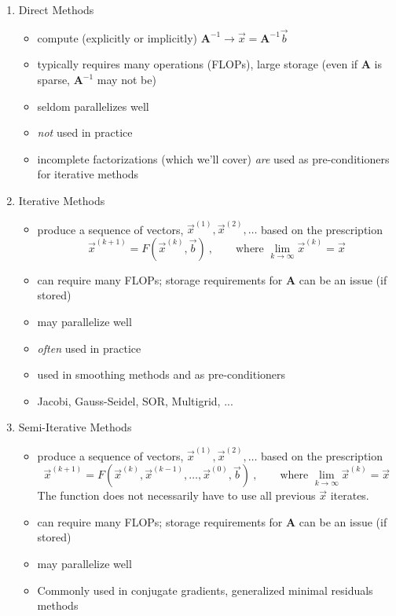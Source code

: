 \documentclass[12pt]{article}
\newcommand{\ve}[1]{\ensuremath{\mathbf{#1}}}
\begin{document}
\begin{enumerate}
\item Direct Methods
  \begin{itemize}
  \item compute (explicitly or implicitly) $\ve{A}^{-1} \rightarrow \vec{x} = \ve{A}^{-1}\vec{b}$
  \item typically requires many operations (FLOPs), large storage (even if $\ve{A}$ is sparse, $\ve{A}^{-1}$ may not be)
  \item seldom parallelizes well
  \item \emph{not} used in practice
  \item incomplete factorizations (which we'll cover) \emph{are} used as pre-conditioners for iterative methods
  \end{itemize}
  
\item Iterative Methods
  \begin{itemize}
  \item produce a sequence of vectors, $\vec{x}^{(1)}, \vec{x}^{(2)}, \dots$ based on the prescription
  \[\vec{x}^{(k+1)} = F(\vec{x}^{(k)}, \vec{b})\:, \qquad \text{where } \displaystyle \lim_{k \rightarrow \infty} \vec{x}^{(k)} = \vec{x}\]
  \item can require many FLOPs; storage requirements for $\ve	{A}$ can be an issue (if stored)
  \item may parallelize well
  \item \emph{often} used in practice
  \item used in smoothing methods and as pre-conditioners
  \item Jacobi, Gauss-Seidel, SOR, Multigrid, ...
  \end{itemize}
  
\item Semi-Iterative Methods
  \begin{itemize}
    \item produce a sequence of vectors, $\vec{x}^{(1)}, \vec{x}^{(2)}, \dots$ based on the prescription
  \[\vec{x}^{(k+1)} = F(\vec{x}^{(k)}, \vec{x}^{(k-1)}, \dots, \vec{x}^{(0)}, \vec{b})\:, \qquad \text{where } \displaystyle \lim_{k \rightarrow \infty} \vec{x}^{(k)} = \vec{x}\]  
  The function does not necessarily have to use all previous $\vec{x}$ iterates.
  \item can require many FLOPs; storage requirements for $\ve	{A}$ can be an issue (if stored)
  \item may parallelize well
  \item Commonly used in conjugate gradients, generalized minimal residuals methods
  \end{itemize}
\end{enumerate}
\end{document}
